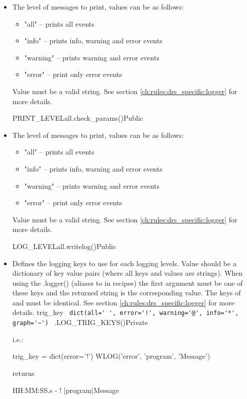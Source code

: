 \begin{itemize}

\item {} 
{The level of messages to print, values can be as follows:
\begin{itemize}
	\item "all" -- prints all events
	\item "info" -- prints info, warning and error events
	\item "warning" -- prints warning and error events
	\item "error" -- print only error events
\end{itemize}
Value must be a valid string. \ifdevguide See section \ref{ch:rules:drs_specific:logger} for more details. \fi}
{PRINT\_LEVEL}{all}{\AllRecipes}{\configtxtfile}{\spirouConfig.check\_params()}{Public}

\item {} 
{The level of messages to print, values can be as follows:
\begin{itemize}
	\item "all" -- prints all events
	\item "info" -- prints info, warning and error events
	\item "warning" -- prints warning and error events
	\item "error" -- print only error events
\end{itemize}
Value must be a valid string. \ifdevguide See section \ref{ch:rules:drs_specific:logger} for more details. \fi}
{LOG\_LEVEL}{all}{\AllRecipes}{\configtxtfile}{\spirouConfig.writelog()}{Public}


\ifdevguide

\item {}
\begin{minipage}[t]{\textwidth}
{Defines the logging keys to use for each logging levels. Value should be a dictionary of key value pairs (where all keys and values are strings). When using the \spirouLog.logger() (aliases to \WLOG in recipes) the first argument must be one of these keys and the returned string is the corresponding value. The keys of  and  must be identical. See section \ref{ch:rules:drs_specific:logger} for more details.}
{trig\_key}
{\lstinline[style=pythoninline]| dict(all=' ', error='!', warning='@', info='*', graph='~') |}
{\AllRecipes}{\spirouConst.LOG\_TRIG\_KEYS()}{\AllRecipes}{Private}
\vspace{-0.25cm}
\begin{thighlight}
i.e.: 
\begin{pythonbox}
trig_key = dict(error='!')
WLOG('error', 'program', 'Message')
\end{pythonbox}
returns
\begin{cmdboxprint}
HH:MM:SS.s - ! |program|Message
\end{cmdboxprint}
\end{thighlight}
\end{minipage}
\fi


\end{itemize}
